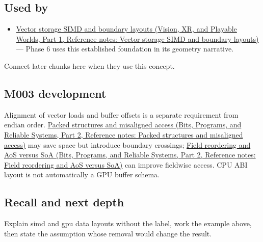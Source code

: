 \subsection{Used by}\label{appendix-3c7b1a56de01-used-by}

\hypertarget{appendix-3c7b1a56de01-used-by}{}

\begin{itemize}
\tightlist
\item
  \href{../07-Vision-XR-and-Playable-Worlds-P01/main.pdf\#appendix-26bf6bf2fb8b}{Vector storage SIMD and boundary layouts (Vision, XR, and Playable Worlds, Part 1, Reference notes: Vector storage SIMD and boundary layouts)} --- Phase 6 uses this established foundation in its geometry narrative.
\end{itemize}

Connect later chunks here when they use this concept.

\subsection{M003 development}\label{appendix-3c7b1a56de01-m003-development}

\hypertarget{appendix-3c7b1a56de01-m003-development}{}

Alignment of vector loads and buffer offsets is a separate requirement from endian order. \href{../01-Bits-Programs-and-Reliable-Systems-P02/main.pdf\#appendix-0682dbfc5f0e}{Packed structures and misaligned access (Bits, Programs, and Reliable Systems, Part 2, Reference notes: Packed structures and misaligned access)} may save space but introduce boundary crossings; \href{../01-Bits-Programs-and-Reliable-Systems-P02/main.pdf\#appendix-5522ad176ca0}{Field reordering and AoS versus SoA (Bits, Programs, and Reliable Systems, Part 2, Reference notes: Field reordering and AoS versus SoA)} can improve fieldwise access. CPU ABI layout is not automatically a GPU buffer schema.

\subsection{Recall and next depth}\label{appendix-3c7b1a56de01-recall-and-next-depth}

\hypertarget{appendix-3c7b1a56de01-recall-and-next-depth}{}

Explain simd and gpu data layouts without the label, work the example above, then state the assumption whose removal would change the result.

